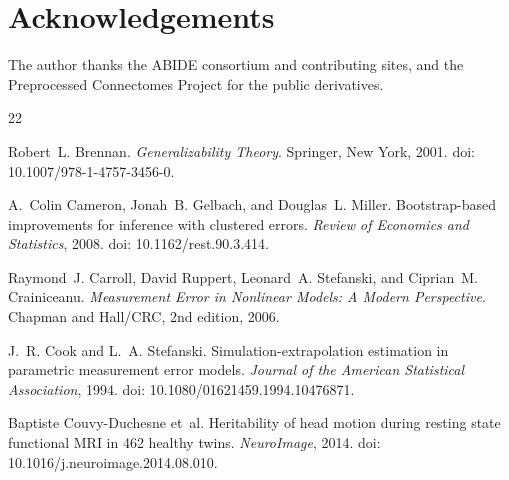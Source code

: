 \documentclass[11pt,a4paper]{article}
\begin{document}
\section*{Acknowledgements}

The author thanks the ABIDE consortium and contributing sites, and the Preprocessed Connectomes Project for the public derivatives.

\begin{thebibliography}{22}
\providecommand{\natexlab}[1]{#1}
\providecommand{\url}[1]{\texttt{#1}}
\providecommand{\doi}[1]{doi: #1}

Robert~L. Brennan.
\newblock \emph{Generalizability Theory}.
\newblock Springer, New York, 2001.
\newblock \doi{10.1007/978-1-4757-3456-0}.

A.~Colin Cameron, Jonah~B. Gelbach, and Douglas~L. Miller.
\newblock Bootstrap-based improvements for inference with clustered errors.
\newblock \emph{Review of Economics and Statistics}, 2008.
\newblock \doi{10.1162/rest.90.3.414}.

Raymond~J. Carroll, David Ruppert, Leonard~A. Stefanski, and Ciprian~M. Crainiceanu.
\newblock \emph{Measurement Error in Nonlinear Models: A Modern Perspective}.
\newblock Chapman and Hall/CRC, 2nd edition, 2006.

J.~R. Cook and L.~A. Stefanski.
\newblock Simulation-extrapolation estimation in parametric measurement error models.
\newblock \emph{Journal of the American Statistical Association}, 1994.
\newblock \doi{10.1080/01621459.1994.10476871}.

Baptiste Couvy-Duchesne et~al.
\newblock Heritability of head motion during resting state functional {MRI} in 462 healthy twins.
\newblock \emph{NeuroImage}, 2014.
\newblock \doi{10.1016/j.neuroimage.2014.08.010}.


\end{thebibliography}
\end{document}
